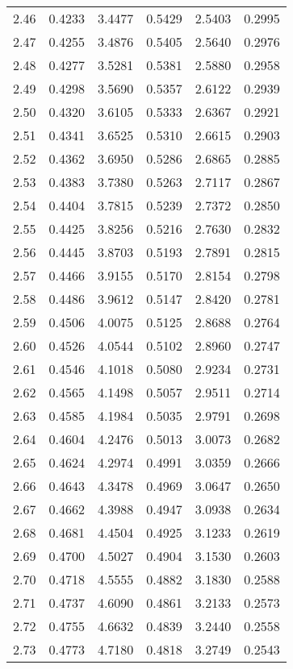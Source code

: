 \documentclass{article}
\begin{document}
\begin{longtable}{cccccc}
2.46 & 0.4233 & 3.4477 & 0.5429 & 2.5403 & 0.2995 \\
2.47 & 0.4255 & 3.4876 & 0.5405 & 2.5640 & 0.2976 \\
2.48 & 0.4277 & 3.5281 & 0.5381 & 2.5880 & 0.2958 \\
2.49 & 0.4298 & 3.5690 & 0.5357 & 2.6122 & 0.2939 \\
2.50 & 0.4320 & 3.6105 & 0.5333 & 2.6367 & 0.2921 \\
2.51 & 0.4341 & 3.6525 & 0.5310 & 2.6615 & 0.2903 \\
2.52 & 0.4362 & 3.6950 & 0.5286 & 2.6865 & 0.2885 \\
2.53 & 0.4383 & 3.7380 & 0.5263 & 2.7117 & 0.2867 \\
2.54 & 0.4404 & 3.7815 & 0.5239 & 2.7372 & 0.2850 \\
2.55 & 0.4425 & 3.8256 & 0.5216 & 2.7630 & 0.2832 \\
2.56 & 0.4445 & 3.8703 & 0.5193 & 2.7891 & 0.2815 \\
2.57 & 0.4466 & 3.9155 & 0.5170 & 2.8154 & 0.2798 \\
2.58 & 0.4486 & 3.9612 & 0.5147 & 2.8420 & 0.2781 \\
2.59 & 0.4506 & 4.0075 & 0.5125 & 2.8688 & 0.2764 \\
2.60 & 0.4526 & 4.0544 & 0.5102 & 2.8960 & 0.2747 \\
2.61 & 0.4546 & 4.1018 & 0.5080 & 2.9234 & 0.2731 \\
2.62 & 0.4565 & 4.1498 & 0.5057 & 2.9511 & 0.2714 \\
2.63 & 0.4585 & 4.1984 & 0.5035 & 2.9791 & 0.2698 \\
2.64 & 0.4604 & 4.2476 & 0.5013 & 3.0073 & 0.2682 \\
2.65 & 0.4624 & 4.2974 & 0.4991 & 3.0359 & 0.2666 \\
2.66 & 0.4643 & 4.3478 & 0.4969 & 3.0647 & 0.2650 \\
2.67 & 0.4662 & 4.3988 & 0.4947 & 3.0938 & 0.2634 \\
2.68 & 0.4681 & 4.4504 & 0.4925 & 3.1233 & 0.2619 \\
2.69 & 0.4700 & 4.5027 & 0.4904 & 3.1530 & 0.2603 \\
2.70 & 0.4718 & 4.5555 & 0.4882 & 3.1830 & 0.2588 \\
2.71 & 0.4737 & 4.6090 & 0.4861 & 3.2133 & 0.2573 \\
2.72 & 0.4755 & 4.6632 & 0.4839 & 3.2440 & 0.2558 \\
2.73 & 0.4773 & 4.7180 & 0.4818 & 3.2749 & 0.2543 \\

\end{longtable}
\end{document}
